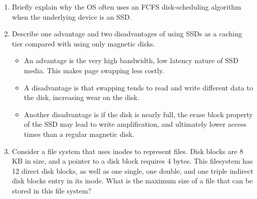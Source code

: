 \documentclass[a4paper, 11pt]{exam}
\begin{document}
\begin{enumerate}
\item Briefly explain why the OS often uses an FCFS disk-scheduling
  algorithm when the underlying device is an SSD.

\item Describe one advantage and two disadvantages of using SSDs as a
  caching tier compared with using only magnetic disks.

\begin{itemize}
\item An advantage is the very high bandwidth, low latency nature of
  SSD media. This makes page swapping less costly.
\item A disadvantage is that swapping tends to read and write
  different data to the disk, increasing wear on the disk.
\item Another disadvantage is if the disk is nearly full, the erase
  block property of the SSD may lead to write amplification, and
  ultimately lower access times than a regular magnetic disk.
\end{itemize}
\item Consider a file system that uses inodes to represent files. Disk
  blocks are 8 KB in size, and a pointer to a disk block requires 4
  bytes. This filesystem has 12 direct disk blocks, as well as one
  single, one double, and one triple indirect disk blocks entry in its
  inode. What is the maximum size of a file that can be stored in this
  file system?




\end{enumerate}
\end{document}
